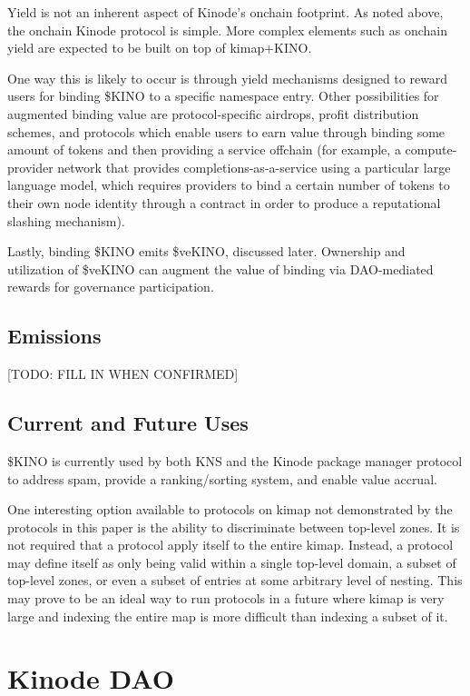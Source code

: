 \documentclass[runningheads]{llncs}
\begin{document}
Yield is not an inherent aspect of Kinode's onchain footprint.
As noted above, the onchain Kinode protocol is simple.
More complex elements such as onchain yield are expected to be built on top of kimap+KINO.

One way this is likely to occur is through yield mechanisms designed to reward users for binding \$KINO to a specific namespace entry. Other possibilities for augmented binding value are protocol-specific airdrops, profit distribution schemes, and protocols which enable users to earn value through binding some amount of tokens and then providing a service offchain (for example, a compute-provider network that provides completions-as-a-service using a particular large language model, which requires providers to bind a certain number of tokens to their own node identity through a contract in order to produce a reputational slashing mechanism).

Lastly, binding \$KINO emits \$veKINO, discussed later.
Ownership and utilization of \$veKINO can augment the value of binding via DAO-mediated rewards for governance participation.

\subsection{Emissions}
\label{sec:kinoemissions}

[TODO: FILL IN WHEN CONFIRMED]

\subsection{Current and Future Uses}
\label{sec:kinouses}

\$KINO is currently used by both KNS and the Kinode package manager protocol to address spam, provide a ranking/sorting system, and enable value accrual.

One interesting option available to protocols on kimap not demonstrated by the protocols in this paper is the ability to discriminate between top-level zones.
It is not required that a protocol apply itself to the entire kimap.
Instead, a protocol may define itself as only being valid within a single top-level domain, a subset of top-level zones, or even a subset of entries at some arbitrary level of nesting.
This may prove to be an ideal way to run protocols in a future where kimap is very large and indexing the entire map is more difficult than indexing a subset of it.

\section{Kinode DAO}
\label{sec:dao}
\end{document}
